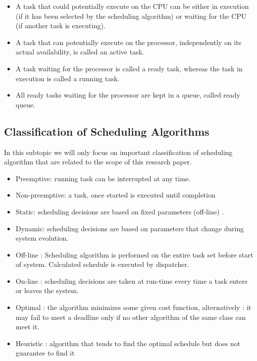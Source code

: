 \begin{itemize}
\item A task that could potentially execute on the CPU can be either in execution (if it has been selected by the scheduling algorithm) or waiting for the CPU (if another task is executing)\cite{b5}.

\item A task that can potentially execute on the processor, independently on its actual availability, is called an active task\cite{b5}.

\item A task waiting for the processor is called a ready task, whereas the task in execution is called a running task\cite{b5}.

\item All ready tasks waiting for the processor are kept in a queue, called ready queue\cite{b5}.

\end{itemize}

\subsection{Classification of Scheduling Algorithms}

In this subtopic we will only focus on important classification of scheduling algorithm that are related to the scope of this research paper. 

\begin{itemize}
\item Preemptive: running task can be interrupted at any time.
\item Non-preemptive: a task, once started is executed until completion
\item Static: scheduling decisions are based on fixed parameters (off-line) .
\item Dynamic: scheduling decisions are based on parameters that change during system evolution.
\item Off-line : Scheduling algorithm is performed on the entire task set before start of system. Calculated schedule is executed by dispatcher. 
\item On-line : scheduling decisions are taken at run-time every time a task enters or leaves the system.
\item Optimal : the algorithm minimizes some given cost function, alternatively : it may fail to meet a deadline only if no other algorithm of the same class can meet it.
\item Heuristic : algorithm that tends to find the optimal schedule but does not guarantee to find it

\end{itemize}


